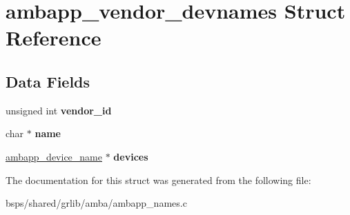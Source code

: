 \hypertarget{structambapp__vendor__devnames}{}\section{ambapp\+\_\+vendor\+\_\+devnames Struct Reference}
\label{structambapp__vendor__devnames}
\subsection*{Data Fields}
\begin{DoxyCompactItemize}
\item 
\mbox{\label{structambapp__vendor__devnames_a659fc7ff9463485f09dd648e9078e653}} 
unsigned int {\bfseries vendor\+\_\+id}
\item 
\mbox{\label{structambapp__vendor__devnames_a1c15ea02f3eb69e9cc31f5cf89fd3b49}} 
char $\ast$ {\bfseries name}
\item 
\mbox{\label{structambapp__vendor__devnames_a995387d14cf93998dc64c60ae4f0bf80}} 
\mbox{\hyperlink{structambapp__device__name}{ambapp\+\_\+device\+\_\+name}} $\ast$ {\bfseries devices}
\end{DoxyCompactItemize}


The documentation for this struct was generated from the following file\+:\begin{DoxyCompactItemize}
\item 
bsps/shared/grlib/amba/ambapp\+\_\+names.\+c\end{DoxyCompactItemize}

